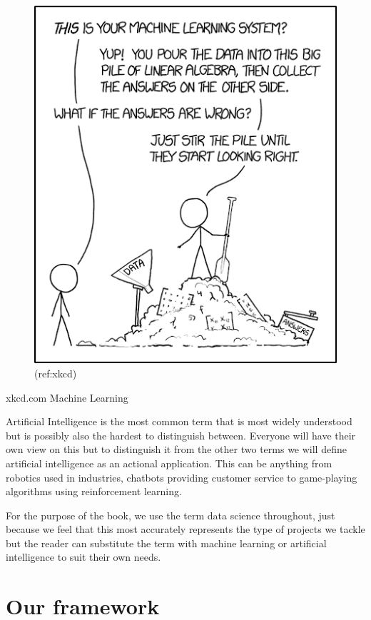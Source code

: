 \documentclass[
]{book}
\begin{document}
\begin{figure}
\includegraphics[width=0.5\linewidth]{figures/xkcd} \caption{(ref:xkcd)}\label{fig:xkcd-fig}
\end{figure}

xkcd.com Machine Learning

Artificial Intelligence is the most common term that is most widely understood but is possibly also the hardest to distinguish between. Everyone will have their own view on this but to distinguish it from the other two terms we will define artificial intelligence as an actional application. This can be anything from robotics used in industries, chatbots providing customer service to game-playing algorithms using reinforcement learning.

For the purpose of the book, we use the term data science throughout, just because we feel that this most accurately represents the type of projects we tackle but the reader can substitute the term with machine learning or artificial intelligence to suit their own needs.

\hypertarget{our-framework}{%
\section{Our framework}\label{our-framework}}
\end{document}
